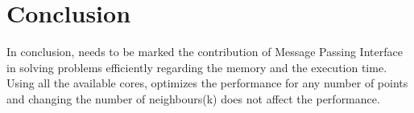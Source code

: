 \documentclass[12pt, a4paper]{report}
\begin{document}
\vspace{5mm} %

    \section*{Conclusion}

    In conclusion, needs to be marked the contribution of Message Passing Interface
    in solving problems efficiently regarding the memory and the execution time. Using all the available
    cores, optimizes the performance for any number of points and changing the number of neighbours(k) does not
    affect the performance. 
\end{document}
